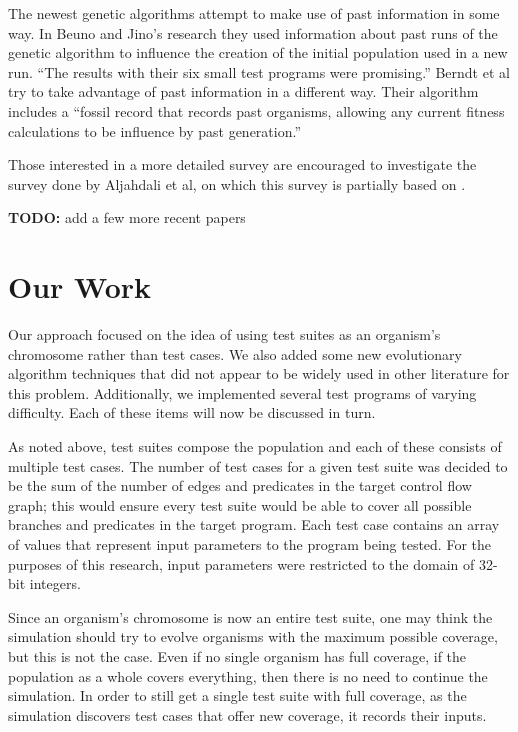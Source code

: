 \documentclass[runningheads]{llncs}
\begin{document}
The newest genetic algorithms attempt to make use of past information in some way. In Beuno and Jino's research they used information about past runs of the genetic algorithm to influence the creation of the initial population used in a new run\cite{limits6}. ``The results with their six small test programs were promising.''\cite{limits6} Berndt et al try to take advantage of past information in a different way. Their algorithm includes a ``fossil record that records past organisms, allowing any current fitness calculations to be influence by past generation.''\cite{limits6}

Those interested in a more detailed survey are encouraged to investigate the survey done by Aljahdali et al, on which this survey is partially based on \cite{limits6}.

\textbf{TODO:} add a few more recent papers




\newpage
\section{Our Work}
Our approach focused on the idea of using test suites as an organism's chromosome rather than test cases. We also added some new evolutionary algorithm techniques that did not appear to be widely used in other literature for this problem. Additionally, we implemented several test programs of varying difficulty. Each of these items will now be discussed in turn.

As noted above, test suites compose the population and each of these consists of multiple test cases. The number of test cases for a given test suite was decided to be the sum of the number of edges and predicates in the target control flow graph; this would ensure every test suite would be able to cover all possible branches and predicates in the target program. Each test case contains an array of values that represent input parameters to the program being tested. For the purposes of this research, input parameters were restricted to the domain of 32-bit integers.

Since an organism’s chromosome is now an entire test suite, one may think the simulation should try to evolve organisms with the maximum possible coverage, but this is not the case. Even if no single organism has full coverage, if the population as a whole covers everything, then there is no need to continue the simulation. In order to still get a single test suite with full coverage, as the simulation discovers test cases that offer new coverage, it records their inputs. 
\end{document}
